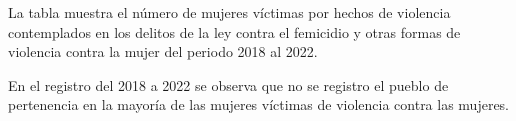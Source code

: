 La tabla muestra el número de mujeres víctimas por hechos de violencia contemplados en los delitos de la ley contra el femicidio y otras formas de violencia contra la mujer del periodo 2018 al 2022. 

En el registro del 2018 a 2022 se observa que no se registro el pueblo de pertenencia en la mayoría de las mujeres víctimas de violencia contra las mujeres.